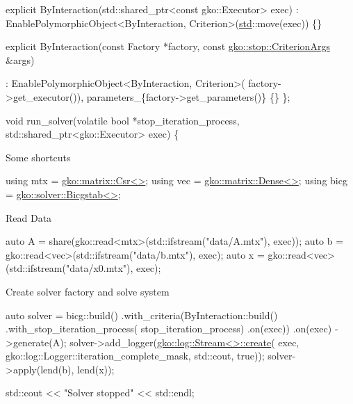 \begin{DoxyCode}
    \textcolor{keyword}{explicit} ByInteraction(std::shared\_ptr<const gko::Executor> exec)
        : EnablePolymorphicObject<ByInteraction, Criterion>(\hyperlink{namespacestd}{std}::move(exec))
    \{\}

    \textcolor{keyword}{explicit} ByInteraction(\textcolor{keyword}{const} Factory *factory,
                           \textcolor{keyword}{const} \hyperlink{structgko_1_1stop_1_1CriterionArgs}{gko::stop::CriterionArgs} &args)

        : EnablePolymorphicObject<ByInteraction, Criterion>(
              factory->get\_executor()),
          parameters\_\{factory->get\_parameters()\}
    \{\}
\};


\textcolor{keywordtype}{void} run\_solver(\textcolor{keyword}{volatile} \textcolor{keywordtype}{bool} *stop\_iteration\_process,
                std::shared\_ptr<gko::Executor> exec)
\{
\end{DoxyCode}


Some shortcuts


\begin{DoxyCode}
\textcolor{keyword}{using} mtx = \hyperlink{classgko_1_1matrix_1_1Csr}{gko::matrix::Csr<>};
\textcolor{keyword}{using} vec = \hyperlink{classgko_1_1matrix_1_1Dense}{gko::matrix::Dense<>};
\textcolor{keyword}{using} bicg = \hyperlink{classgko_1_1solver_1_1Bicgstab}{gko::solver::Bicgstab<>};
\end{DoxyCode}


Read Data


\begin{DoxyCode}
\textcolor{keyword}{auto} A = share(gko::read<mtx>(std::ifstream(\textcolor{stringliteral}{"data/A.mtx"}), exec));
\textcolor{keyword}{auto} b = gko::read<vec>(std::ifstream(\textcolor{stringliteral}{"data/b.mtx"}), exec);
\textcolor{keyword}{auto} x = gko::read<vec>(std::ifstream(\textcolor{stringliteral}{"data/x0.mtx"}), exec);
\end{DoxyCode}


Create solver factory and solve system


\begin{DoxyCode}
\textcolor{keyword}{auto} solver = bicg::build()
                  .with\_criteria(ByInteraction::build()
                                     .with\_stop\_iteration\_process(
                                         stop\_iteration\_process)
                                     .on(exec))
                  .on(exec)
                  ->generate(A);
solver->add\_logger(\hyperlink{classgko_1_1log_1_1Stream}{gko::log::Stream<>::create}(
    exec, gko::log::Logger::iteration\_complete\_mask, std::cout, \textcolor{keyword}{true}));
solver->apply(lend(b), lend(x));

std::cout << \textcolor{stringliteral}{"Solver stopped"} << std::endl;
\end{DoxyCode}



